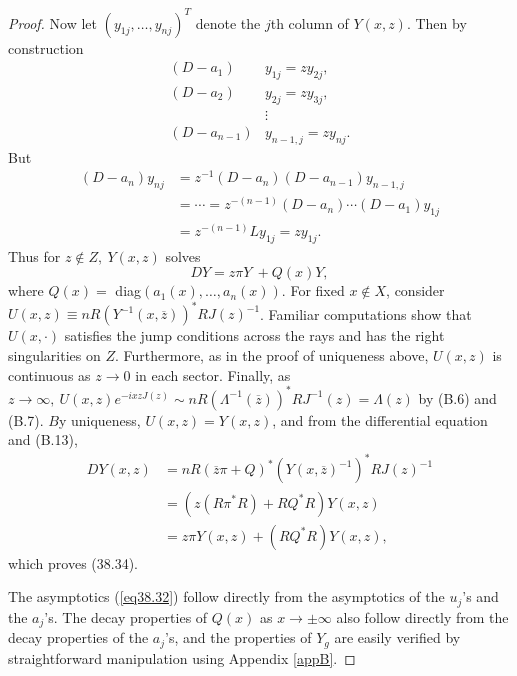 \documentclass{surv-l}
\theoremstyle{plain}
\theoremstyle{definition}
\numberwithin{equation}{chapter}
\begin{document}
\begin{proof}
Now let $(y_{1j},\ldots,y_{nj})^{T}$ denote the $j$th column of $Y(x, z)$. Then by construction
\begin{align*}
(D-a_{1})&y_{1j}=zy_{2j},\\
(D-a_{2})&y_{2j}=zy_{3j},\\
&\vdots\\
(D-a_{n-1})&y_{n-1,j}=zy_{nj}.
\end{align*}
But
\begin{align*}
(D-a_{n})y_{nj}&=z^{-1}(D-a_{n})(D-a_{n-1})y_{n-1,j}\\
&=\cdots= z^{-(n-1)}(D-a_{n})\cdots(D-a_{1})y_{1j}\\
&=z^{-(n-1)}Ly_{1j}= zy_{1j}.
\end{align*}
Thus for $z\not\in Z,\ Y(x, z)$ solves
\begin{equation*}
DY=z\pi Y\ +Q(x)Y,
\end{equation*}
where $Q(x)=$ diag$(a_{1}(x),\ldots,a_{n}(x))$. For fixed $ x\not\in X$, consider $ U(x, z)\equiv nR(Y^{-1}(x,\overline{z}))^{*}RJ(z)^{-1}$. Familiar computations show that $U(x,\cdot)$ satisfies the jump conditions across the rays and has the right singularities on $Z$. Furthermore, as in the proof of uniqueness above, $U(x,z)$ is continuous as $z\rightarrow 0$ in each sector. Finally, as $ z\rightarrow\infty,\ U(x, z)e^{-ixzJ(z)}\sim nR(\Lambda^{-1}(\overline{z}))^{*}RJ^{-1}(z)=\Lambda(z)$ by (B.6) and (B.7). $B$y uniqueness, $U(x,z)=Y(x, z)$, and from the differential equation and (B.13),
\begin{align*}
DY(x, z)&=nR(\overline{z}\pi+Q)^{*}(Y(x,\overline{z})^{-1})^{*}RJ(z)^{-1}\\
&=(z(R\pi^{*}R)+RQ^{*}R)Y(x, z)\\
&=z\pi Y(x,z)+(RQ^{*}R)Y(x, z),
\end{align*}
which proves (38.34).

The asymptotics (\ref{eq38.32}) follow directly from the asymptotics of the $u_{j}$'s and the $a_{j}$'s. The decay properties of $Q(x)$ as $x \rightarrow\pm\infty$ also follow directly from the decay properties of the $a_{j}$'s, and the properties of $Y_{g}$ are easily verified by straightforward manipulation using Appendix \ref{appB}.
\end{proof}
\end{document}
